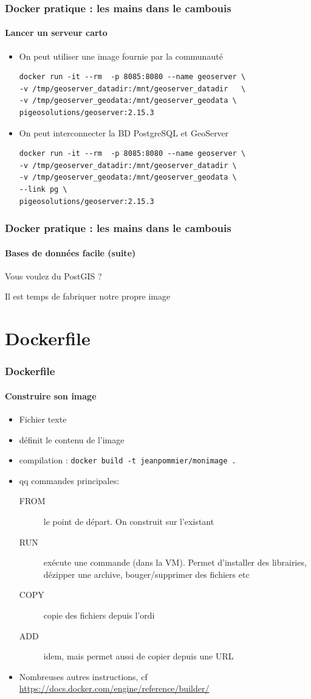 \documentclass[11pt]{beamer}
\begin{document}
\begin{frame}[fragile]
\frametitle{Docker pratique : les mains dans le cambouis }
\framesubtitle{Lancer un serveur carto}
\begin{itemize}
\item On peut utiliser une image fournie par la communauté
\begin{lstlisting}
docker run -it --rm  -p 8085:8080 --name geoserver \
-v /tmp/geoserver_datadir:/mnt/geoserver_datadir   \
-v /tmp/geoserver_geodata:/mnt/geoserver_geodata \
pigeosolutions/geoserver:2.15.3
\end{lstlisting}
\item On peut interconnecter la BD PostgreSQL  et GeoServer
\begin{lstlisting}
docker run -it --rm  -p 8085:8080 --name geoserver \
-v /tmp/geoserver_datadir:/mnt/geoserver_datadir \
-v /tmp/geoserver_geodata:/mnt/geoserver_geodata \
--link pg \
pigeosolutions/geoserver:2.15.3
\end{lstlisting}
\end{itemize}
\end{frame}

\begin{frame}[fragile]
\frametitle{Docker pratique : les mains dans le cambouis }
\framesubtitle{Bases de données facile (suite)}
	Vous voulez du PostGIS ?
	\vspace{2em}
	
	Il est temps de fabriquer notre propre image
\end{frame}


\section{Dockerfile}

\begin{frame}[fragile]
\frametitle{Dockerfile}
\framesubtitle{Construire son image}
\begin{itemize}
	\item Fichier texte
	\item définit le contenu de l'image
	\item compilation : \verb|docker build -t jeanpommier/monimage .|
	\item qq commandes principales:
	\begin{description}
		\item[FROM] le point de départ. On construit sur l'existant
		\item[RUN]  exécute une commande (dans la VM). Permet d'installer des librairies, dézipper une archive, bouger/supprimer des fichiers etc
		\item[COPY] copie des fichiers depuis l'ordi
		\item[ADD]  idem, mais permet aussi de copier depuis une URL
		
	\end{description}
	\item[]		Nombreuses autres instructions, cf \url{https://docs.docker.com/engine/reference/builder/}
\end{itemize}
\end{frame}
\end{document}
